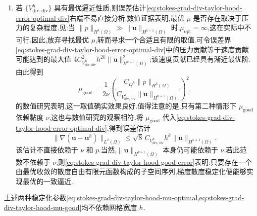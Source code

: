 \begin{note}
\begin{enumerate}[label=\roman*)]
  \item 若 $\{V_{\mathrm{div,div}}^h\}$ 具有最优逼近性质,则误差估计\cref{eq:stokes-grad-div-taylor-hood-error-optimal-div}右端不易直接分析.数值证据表明,最优 $\mu$ 是否存在取决于压力的复杂程度,见\textcite{JenkinsJohnLinkeRebholz2014}:当 $\|p\|_{H^k(\Omega)}\gg\|\bm{u}\|_{H^{k+1}(\Omega)}$ 时,$\mu_{\mathrm{opt}}=\infty$,这在实际中不可行.因此,放弃寻找最优 $\mu$,转而寻求一个合适且有限的取值.可令误差界\cref{eq:stokes-grad-div-taylor-hood-error-optimal-div}中的压力贡献等于速度贡献可能达到的最大值 $4C_{V_{\mathrm{div,div}}^h}^2h^{2k}\|\bm{u}\|_{H^{k+1}(\Omega)}^2$;该速度贡献已经具有渐近最优阶.由此得到
  \begin{equation}\label{eq:stokes-grad-div-taylor-hood-mu-good}
   \mu_{\mathrm{good}}
   =\frac{1}{2\nu}
      \left(\frac{C_{Q^h}\|p\|_{H^k(\Omega)}}
      {C_{V_{\mathrm{div,div}}^h}\|\bm{u}\|_{H^{k+1}(\Omega)}}\right)^2.
  \end{equation}
  \textcite{JenkinsJohnLinkeRebholz2014}的数值研究表明,这一取值确实效果良好.值得注意的是,只有第二种情形下 $\mu_{\mathrm{good}}$ 依赖黏度 $\nu$,这也与数值研究的观察相符.将 $\mu_{\mathrm{good}}$ 代入\cref{eq:stokes-grad-div-taylor-hood-error-optimal-div},得到误差估计
  \begin{equation}\label{eq:stokes-grad-div-taylor-hood-good-error}
   \|\nabla(\bm{u}-\bm{u}^h)\|_{L^2(\Omega)}
   \leq \sqrt{8}\,C_{V_{\mathrm{div,div}}^h}h^k
                  \|\bm{u}\|_{H^{k+1}(\Omega)}.
  \end{equation}
  该估计不直接依赖于 $\nu$ 和 $p$.当然,$\|\bm{u}\|_{H^{k+1}(\Omega)}$ 本身仍可能依赖于 $\nu$.若此范数不依赖于 $\nu$,则\cref{eq:stokes-grad-div-taylor-hood-good-error}表明:只要存在一个由最优收敛的散度自由有限元函数构成的子空间序列,梯度散度稳定化便能够实现最优的一致逼近.
\end{enumerate}
上述两种稳定化参数\cref{eq:stokes-grad-div-taylor-hood-mu-optimal,eq:stokes-grad-div-taylor-hood-mu-good}均不依赖网格宽度 $h$.
\end{note}

